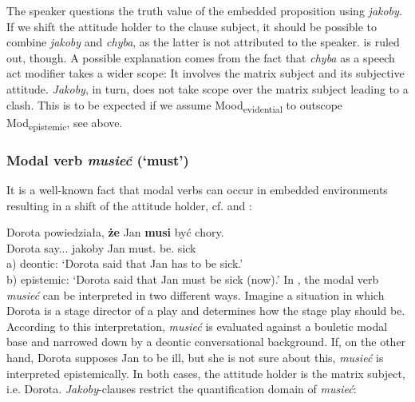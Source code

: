 \documentclass[output=paper]{langsci/langscibook}
\begin{document}
\ea {}
\z\z
The speaker questions the truth value of the embedded proposition using \emph{jakoby}. If we shift the attitude holder to the clause subject, it should be possible to combine \emph{jakoby} and \emph{chyba}, as the latter is not attributed to the speaker.  is ruled out, though. A possible explanation comes from the fact that \emph{chyba} as a speech act modifier takes a wider scope: It involves the matrix subject and its subjective attitude. \emph{Jakoby}, in turn, does not take scope over the matrix subject leading to a clash. This is to be expected if we assume Mood\textsubscript{evidential} to outscope Mod\textsubscript{epistemic}, see  above.

\subsubsection{Modal verb \textit{musieć} (`must')}
It is a well-known fact that modal verbs can occur in embedded environments resulting in a shift of the attitude holder, cf. \textcite{Hacquard2006} and \textcite{Hacquard-Wellwood2012}:

\ea \gll Dorota powiedziała, \textbf{że} Jan \textbf{musi} być chory. \label{must} \\
		Dorota say.{\lptcp}.{\sg}.{\fem} jakoby Jan must.{\thirdperson}{\sg} be.{\infv} sick \\
\glt	a) deontic: `Dorota said that Jan has to be sick.'\\
	b) epistemic: `Dorota said that Jan must be sick (now).'
\z
In , the modal verb \emph{musieć} can be interpreted in two different ways. Imagine a situation in which Dorota is a stage director of a play and determines how the stage play should be. According to this interpretation, \emph{musieć} is evaluated against a bouletic modal base and narrowed down by a deontic conversational background. If, on the other hand, Dorota supposes Jan to be ill, but she is not sure about this, \emph{musieć} is interpreted epistemically. In both cases, the attitude holder is the matrix subject, i.e. Dorota. \emph{Jakoby}-clauses restrict the quantification domain of \emph{musieć}:\largerpage[2]
\end{document}
